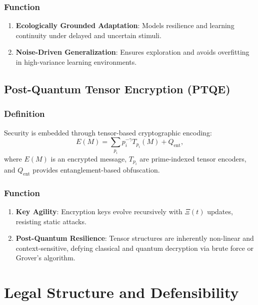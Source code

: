 \documentclass{article}
\theoremstyle{plain}
\theoremstyle{claimstyle}
\begin{document}
\subsubsection{Function}

\begin{enumerate}
    \item \textbf{Ecologically Grounded Adaptation}: Models resilience and learning continuity under delayed and uncertain stimuli.
    
    \item \textbf{Noise-Driven Generalization}: Ensures exploration and avoids overfitting in high-variance learning environments.
\end{enumerate}

\subsection{Post-Quantum Tensor Encryption (PTQE)}

\subsubsection{Definition}

Security is embedded through tensor-based cryptographic encoding:
\begin{equation}
E(M) = \sum_{p_i} p_i^{-\gamma} T_{p_i}(M) + Q_{\text{ent}},
\end{equation}
where $E(M)$ is an encrypted message, $T_{p_i}$ are prime-indexed tensor encoders, and $Q_{\text{ent}}$ provides entanglement-based obfuscation.

\subsubsection{Function}

\begin{enumerate}
    \item \textbf{Key Agility}: Encryption keys evolve recursively with $\Xi(t)$ updates, resisting static attacks.
    
    \item \textbf{Post-Quantum Resilience}: Tensor structures are inherently non-linear and context-sensitive, defying classical and quantum decryption via brute force or Grover’s algorithm.
\end{enumerate}
\section{Legal Structure and Defensibility}
\end{document}
